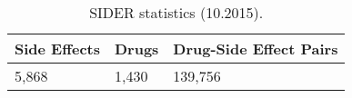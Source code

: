 \begin{table}
\caption{SIDER statistics (10.2015).}
\vspace{0.25em}
\centering
\begin{tabular}{|l|l|l|}
\hline
\textbf{Side Effects} & \textbf{Drugs} & \textbf{Drug-Side Effect Pairs} \\ \hline
5,868        & 1,430 & 139,756 \\ \hline
\end{tabular}
\label{tab:sider_stats}
\end{table}